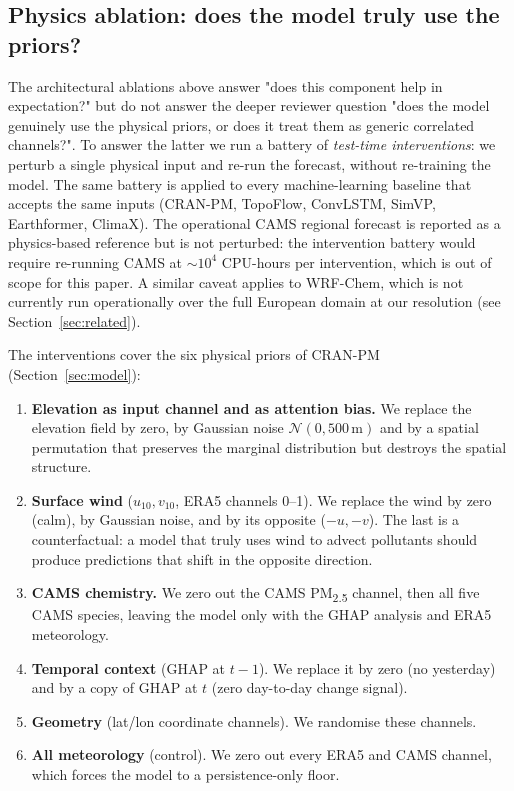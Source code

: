 

\subsection{Physics ablation: does the model truly use the priors?}
\label{sec:phys_ablation}

The architectural ablations above answer "does this component help
in expectation?" but do not answer the deeper reviewer question
"does the model genuinely use the physical priors, or does it
treat them as generic correlated channels?". To answer the latter
we run a battery of \emph{test-time interventions}: we perturb a
single physical input and re-run the forecast, without re-training
the model. The same battery is applied to every machine-learning
baseline that accepts the same inputs (CRAN-PM, TopoFlow, ConvLSTM,
SimVP, Earthformer, ClimaX). The operational CAMS regional forecast
is reported as a physics-based reference but is not perturbed: the
intervention battery would require re-running CAMS at $\sim 10^4$
CPU-hours per intervention, which is out of scope for this paper. A
similar caveat applies to WRF-Chem, which is not currently run
operationally over the full European domain at our resolution
(see Section~\ref{sec:related}).

The interventions cover the six physical priors of CRAN-PM
(Section~\ref{sec:model}):

\begin{enumerate}
\item \textbf{Elevation as input channel and as attention bias.}
We replace the elevation field by zero, by Gaussian noise
$\mathcal{N}(0, 500\,\text{m})$ and by a spatial permutation that
preserves the marginal distribution but destroys the spatial
structure.
\item \textbf{Surface wind} ($u_{10}, v_{10}$, ERA5 channels 0--1).
We replace the wind by zero (calm), by Gaussian noise, and by its
opposite ($-u, -v$). The last is a counterfactual: a model that
truly uses wind to advect pollutants should produce predictions
that shift in the opposite direction.
\item \textbf{CAMS chemistry.} We zero out the CAMS PM\textsubscript{2.5}
channel, then all five CAMS species, leaving the model only with
the GHAP analysis and ERA5 meteorology.
\item \textbf{Temporal context} (GHAP at $t-1$). We replace it by
zero (no yesterday) and by a copy of GHAP at $t$ (zero day-to-day
change signal).
\item \textbf{Geometry} (lat/lon coordinate channels). We
randomise these channels.
\item \textbf{All meteorology} (control). We zero out every ERA5
and CAMS channel, which forces the model to a persistence-only
floor.
\end{enumerate}

